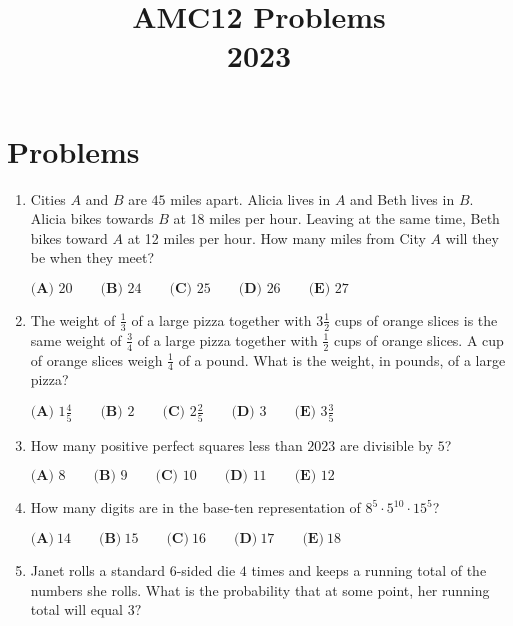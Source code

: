 \documentclass{article}
\title{AMC12 Problems \\ 2023}
\date{}
\begin{document}
\maketitle\thispagestyle{fancy}\newpage\section*{Problems}\begin{enumerate}[label=\arabic*., itemsep=0.5em]\item Cities \(A\) and \(B\) are \(45\) miles apart. Alicia lives in \(A\) and Beth lives in \(B\). Alicia bikes towards \(B\) at 18 miles per hour. Leaving at the same time, Beth bikes toward \(A\) at 12 miles per hour. How many miles from City \(A\) will they be when they meet?

\(\textbf{(A) }20\qquad\textbf{(B) }24\qquad\textbf{(C) }25\qquad\textbf{(D) }26\qquad\textbf{(E) }27\)\par \vspace{0.5em}\item The weight of \(\frac{1}{3}\) of a large pizza together with \(3 \frac{1}{2}\) cups of orange slices is the same weight of \(\frac{3}{4}\) of a large pizza together with \(\frac{1}{2}\) cups of orange slices. A cup of orange slices weigh \(\frac{1}{4}\) of a pound. What is the weight, in pounds, of a large pizza?

\(\textbf{(A) }1\frac{4}{5}\qquad\textbf{(B) }2\qquad\textbf{(C) }2\frac{2}{5}\qquad\textbf{(D) }3\qquad\textbf{(E) }3\frac{3}{5}\)\par \vspace{0.5em}\item How many positive perfect squares less than \(2023\) are divisible by \(5\)?

\(\textbf{(A) }8\qquad\textbf{(B) }9\qquad\textbf{(C) }10\qquad\textbf{(D) }11\qquad\textbf{(E) }12\)\par \vspace{0.5em}\item How many digits are in the base-ten representation of \(8^5 \cdot 5^{10} \cdot 15^5\)?

\(\textbf{(A)}~14\qquad\textbf{(B)}~15\qquad\textbf{(C)}~16\qquad\textbf{(D)}~17\qquad\textbf{(E)}~18\qquad\)\par \vspace{0.5em}\item Janet rolls a standard \(6\)-sided die \(4\) times and keeps a running total of the numbers she rolls. What is the probability that at some point, her running total will equal \(3?\)


\end{enumerate}
\end{document}
